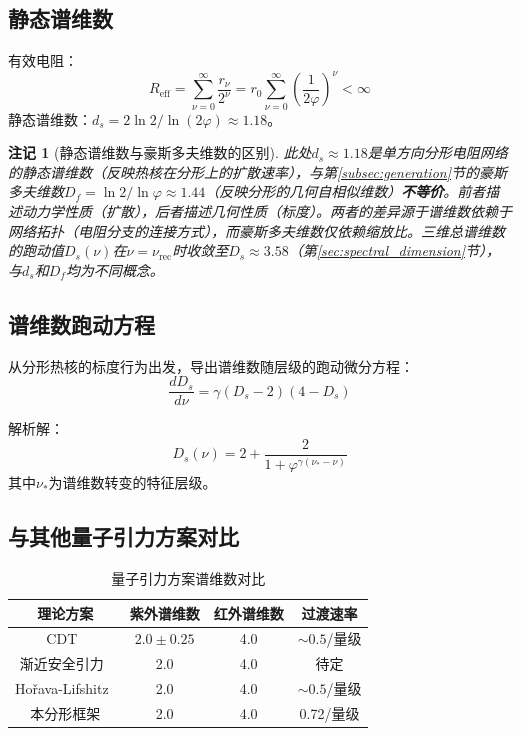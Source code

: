 \documentclass[12pt,a4paper,twocolumn]{article}
\renewcommand{\phi}{\varphi}
\newtheorem{remark}[theorem]{注记}
\begin{document}
\subsection{静态谱维数}
有效电阻：
\[
R_{\text{eff}} = \sum_{\nu=0}^\infty \frac{r_\nu}{2^\nu} = r_0 \sum_{\nu=0}^\infty \left(\frac{1}{2\phi}\right)^\nu < \infty
\]
静态谱维数：$d_s = 2\ln2/\ln(2\phi) \approx 1.18$。

\begin{remark}[静态谱维数与豪斯多夫维数的区别]
此处$d_s \approx 1.18$是单方向分形电阻网络的静态谱维数（反映热核在分形上的扩散速率），与第\ref{subsec:generation}节的豪斯多夫维数$D_f = \ln 2/\ln\phi \approx 1.44$（反映分形的几何自相似维数）\textbf{不等价}。前者描述动力学性质（扩散），后者描述几何性质（标度）。两者的差异源于谱维数依赖于网络拓扑（电阻分支的连接方式），而豪斯多夫维数仅依赖缩放比。三维总谱维数的跑动值$D_s(\nu)$在$\nu=\nu_{\text{rec}}$时收敛至$D_s\approx 3.58$（第\ref{sec:spectral_dimension}节），与$d_s$和$D_f$均为不同概念。
\end{remark}

\subsection{谱维数跑动方程}
从分形热核的标度行为出发，导出谱维数随层级的跑动微分方程：
\[
\frac{dD_s}{d\nu} = \gamma (D_s-2)(4-D_s)
\]

解析解：
\[
D_s(\nu) = 2 + \frac{2}{1+\phi^{\gamma(\nu_*-\nu)}}
\]
其中$\nu_*$为谱维数转变的特征层级。

\subsection{与其他量子引力方案对比}
\begin{table}[H]
\centering
\footnotesize
\caption{量子引力方案谱维数对比}
\begin{tabular}{c|c|c|c}
\hline
\textbf{理论方案} & \textbf{紫外谱维数} & \textbf{红外谱维数} & \textbf{过渡速率} \\
\hline
CDT~\cite{Ambjorn2004} & $2.0\pm0.25$ & 4.0 & $\sim0.5$/量级 \\
渐近安全引力~\cite{Reuter1998} & 2.0 & 4.0 & 待定 \\
Hořava-Lifshitz~\cite{Horava2009} & 2.0 & 4.0 & $\sim0.5$/量级 \\
本分形框架 & 2.0 & 4.0 & 0.72/量级 \\
\hline
\end{tabular}
\end{table}
\end{document}
